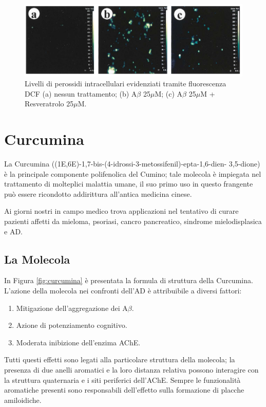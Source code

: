 \documentclass[a4paper, 12pt]{article}
\begin{document}
\begin{figure}[H]
	\centering
	\includegraphics[width=.9\linewidth]{immagini/roi_resveratrolo.png}
	\caption{Livelli di perossidi intracellulari evidenziati tramite fluorescenza DCF (a) nessun trattamento; (b) A$\beta$ 25$\mu$M; (c) A$\beta$ 25$\mu$M + Resveratrolo 25$\mu$M.}
	\label{fig:roi_resveratrolo}
\end{figure}

\section{Curcumina}
\label{sec:curc}
La Curcumina ((1E,6E)-1,7-bis-(4-idrossi-3-metossifenil)-epta-1,6-dien- 3,5-dione) è la principale componente polifenolica del Cumino; tale molecola è impiegata nel trattamento di molteplici malattia umane, il suo primo uso in questo frangente può essere ricondotto addirittura all'antica medicina cinese.

Ai giorni nostri in campo medico trova applicazioni nel tentativo di curare pazienti affetti da mieloma, psoriasi, cancro pancreatico, sindrome mielodisplasica e AD.

\subsection{La Molecola}
In Figura \ref{fig:curcumina} è presentata la formula di struttura della Curcumina. L'azione della molecola nei confronti dell'AD è attribuibile a diversi fattori:

\begin{enumerate}
	\item Mitigazione dell'aggregazione dei A$\beta$.
	\item Azione di potenziamento cognitivo.
	\item Moderata inibizione dell'enzima AChE.
\end{enumerate}

Tutti questi effetti sono legati alla particolare struttura della molecola; la presenza di due anelli aromatici e la loro distanza relativa possono interagire con la struttura quaternaria  e i siti periferici dell'AChE. Sempre le funzionalità aromatiche presenti sono responsabili dell'effetto sulla formazione di placche amiloidiche.
\end{document}
